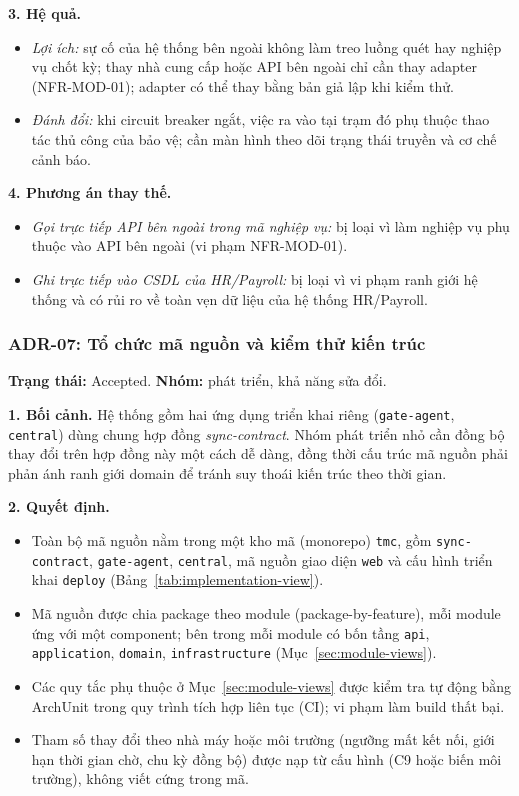 \noindent\textbf{3. Hệ quả.}
\begin{itemize}
    \item \textit{Lợi ích:} sự cố của hệ thống bên ngoài không làm treo luồng quét hay nghiệp vụ chốt kỳ; thay nhà cung cấp hoặc API bên ngoài chỉ cần thay adapter (NFR-MOD-01); adapter có thể thay bằng bản giả lập khi kiểm thử.
    \item \textit{Đánh đổi:} khi circuit breaker ngắt, việc ra vào tại trạm đó phụ thuộc thao tác thủ công của bảo vệ; cần màn hình theo dõi trạng thái truyền và cơ chế cảnh báo.
\end{itemize}

\noindent\textbf{4. Phương án thay thế.}
\begin{itemize}
    \item \textit{Gọi trực tiếp API bên ngoài trong mã nghiệp vụ:} bị loại vì làm nghiệp vụ phụ thuộc vào API bên ngoài (vi phạm NFR-MOD-01).
    \item \textit{Ghi trực tiếp vào CSDL của HR/Payroll:} bị loại vì vi phạm ranh giới hệ thống và có rủi ro về toàn vẹn dữ liệu của hệ thống HR/Payroll.
\end{itemize}

\subsubsection{ADR-07: Tổ chức mã nguồn và kiểm thử kiến trúc}\label{adr:07}
\textbf{Trạng thái:} Accepted. \textbf{Nhóm:} phát triển, khả năng sửa đổi.

\noindent\textbf{1. Bối cảnh.} Hệ thống gồm hai ứng dụng triển khai riêng (\texttt{gate-agent}, \texttt{central}) dùng chung hợp đồng \textit{sync-contract}. Nhóm phát triển nhỏ cần đồng bộ thay đổi trên hợp đồng này một cách dễ dàng, đồng thời cấu trúc mã nguồn phải phản ánh ranh giới domain để tránh suy thoái kiến trúc theo thời gian.

\noindent\textbf{2. Quyết định.}
\begin{itemize}
    \item Toàn bộ mã nguồn nằm trong một kho mã (monorepo) \texttt{tmc}, gồm \texttt{sync-contract}, \texttt{gate-agent}, \texttt{central}, mã nguồn giao diện \texttt{web} và cấu hình triển khai \texttt{deploy} (Bảng~\ref{tab:implementation-view}).
    \item Mã nguồn được chia package theo module (package-by-feature), mỗi module ứng với một component; bên trong mỗi module có bốn tầng \texttt{api}, \texttt{application}, \texttt{domain}, \texttt{infrastructure} (Mục~\ref{sec:module-views}).
    \item Các quy tắc phụ thuộc ở Mục~\ref{sec:module-views} được kiểm tra tự động bằng ArchUnit trong quy trình tích hợp liên tục (CI); vi phạm làm build thất bại.
    \item Tham số thay đổi theo nhà máy hoặc môi trường (ngưỡng mất kết nối, giới hạn thời gian chờ, chu kỳ đồng bộ) được nạp từ cấu hình (C9 hoặc biến môi trường), không viết cứng trong mã.
\end{itemize}

